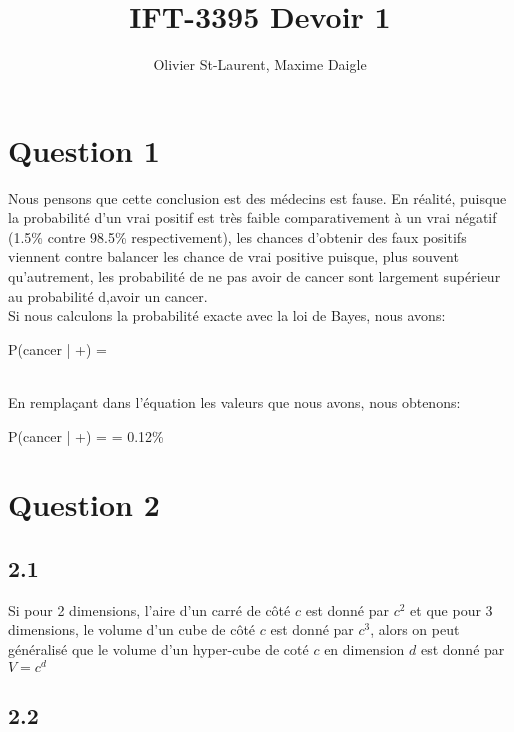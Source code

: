 \documentclass[12pt]{article}
\author{Olivier St-Laurent, Maxime Daigle}
\title{IFT-3395  Devoir 1}
\newenvironment{eqs*}{\begin{equation*}\begin{aligned}}{\end{aligned}\end{equation*}}
\begin{document}
\maketitle

\section{Question 1}

Nous pensons que cette conclusion est des médecins est fause. En réalité, puisque la probabilité d'un vrai positif est très faible comparativement à un
vrai négatif (1.5\% contre 98.5\% respectivement), les chances d'obtenir des faux positifs viennent contre balancer les chance de vrai positive puisque, plus souvent qu'autrement, les probabilité de ne pas avoir de cancer sont largement supérieur au probabilité d,avoir un cancer.
\\[\baselineskip]
Si nous calculons la probabilité exacte avec la loi de Bayes, nous avons:
\begin{eqs*}
P(cancer | +) = 
\end{eqs*}
\\[\baselineskip]
En remplaçant dans l'équation les valeurs que nous avons, nous obtenons:
\begin{eqs*}
P(cancer | +) =  = 0.12\%
\end{eqs*}

\section{Question 2}
\subsection{2.1}
Si pour 2 dimensions, l'aire d'un carré de côté $c$ est donné par $c^2$ et que pour 3 dimensions, le volume d'un cube de côté $c$ est donné par $c^3$, alors
on peut généralisé que le volume d'un hyper-cube de coté $c$ en dimension $d$ est donné par $V = c^d$


\subsection{2.2}
\end{document}
